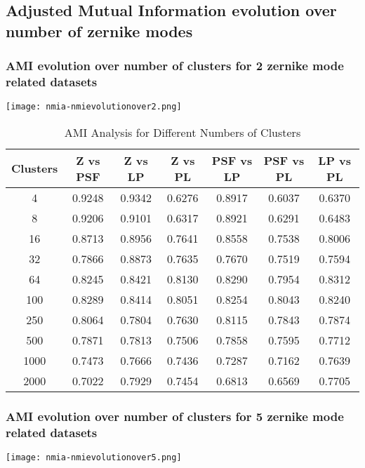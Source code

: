 \subsection{Adjusted Mutual Information evolution over number of zernike modes}

	\subsubsection{AMI evolution over number of clusters for 2 zernike mode related datasets}
		\begin{figure*}[ht!]
			\centering
			\texttt{[image: nmia-nmievolutionover2.png]}
		\end{figure*}
		\begin{table}[!h]
		\centering
		\begin{tabular}{|c|c|c|c|c|c|c|}
\hline
\textbf{Clusters} & \textbf{Z vs PSF} & \textbf{Z vs LP} & \textbf{Z vs PL} & \textbf{PSF vs LP} & \textbf{PSF vs PL} & \textbf{LP vs PL} \\
\hline
4   & 0.9248 & 0.9342 & 0.6276 & 0.8917 & 0.6037 & 0.6370 \\
8   & 0.9206 & 0.9101 & 0.6317 & 0.8921 & 0.6291 & 0.6483 \\
16  & 0.8713 & 0.8956 & 0.7641 & 0.8558 & 0.7538 & 0.8006 \\
32  & 0.7866 & 0.8873 & 0.7635 & 0.7670 & 0.7519 & 0.7594 \\
64  & 0.8245 & 0.8421 & 0.8130 & 0.8290 & 0.7954 & 0.8312 \\
100 & 0.8289 & 0.8414 & 0.8051 & 0.8254 & 0.8043 & 0.8240 \\
250 & 0.8064 & 0.7804 & 0.7630 & 0.8115 & 0.7843 & 0.7874 \\
500 & 0.7871 & 0.7813 & 0.7506 & 0.7858 & 0.7595 & 0.7712 \\
1000& 0.7473 & 0.7666 & 0.7436 & 0.7287 & 0.7162 & 0.7639 \\
2000& 0.7022 & 0.7929 & 0.7454 & 0.6813 & 0.6569 & 0.7705 \\
\hline
\end{tabular}
\caption{AMI Analysis for Different Numbers of Clusters}
\end{table}		
		\FloatBarrier
		
	\subsubsection{AMI evolution over number of clusters for 5 zernike mode related datasets}
		\begin{figure*}[ht!]
			\centering
			\texttt{[image: nmia-nmievolutionover5.png]}
		\end{figure*}
		
